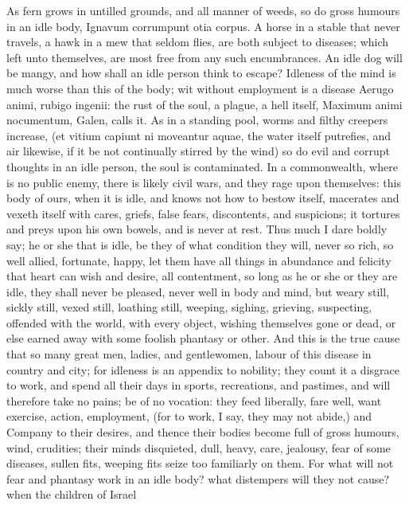 {As fern grows in untilled grounds, and all manner of weeds, so do gross
humours in an idle body, Ignavum corrumpunt otia corpus. A horse in a
stable that never travels, a hawk in a mew that seldom flies, are both
subject to diseases; which left unto themselves, are most free from any
such encumbrances. An idle dog will be mangy, and how shall an idle
person think to escape? Idleness of the mind is much worse than this of
the body; wit without employment is a disease Aerugo animi,
rubigo ingenii: the rust of the soul, a plague, a hell itself,
Maximum animi nocumentum, Galen, calls it. As in a standing pool,
worms and filthy creepers increase, (et vitium capiunt ni moveantur
aquae, the water itself putrefies, and air likewise, if it be not
continually stirred by the wind) so do evil and corrupt thoughts in an
idle person, the soul is contaminated. In a commonwealth, where is no
public enemy, there is likely civil wars, and they rage upon
themselves: this body of ours, when it is idle, and knows not how to
bestow itself, macerates and vexeth itself with cares, griefs, false
fears, discontents, and suspicions; it tortures and preys upon his own
bowels, and is never at rest. Thus much I dare boldly say; he or she
that is idle, be they of what condition they will, never so rich, so
well allied, fortunate, happy, let them have all things in abundance
and felicity that heart can wish and desire, all contentment, so long
as he or she or they are idle, they shall never be pleased, never well
in body and mind, but weary still, sickly still, vexed still, loathing
still, weeping, sighing, grieving, suspecting, offended with the world,
with every object, wishing themselves gone or dead, or else earned away
with some foolish phantasy or other. And this is the true cause that so
many great men, ladies, and gentlewomen, labour of this disease in
country and city; for idleness is an appendix to nobility; they count
it a disgrace to work, and spend all their days in sports, recreations,
and pastimes, and will therefore take no pains; be of no vocation: they
feed liberally, fare well, want exercise, action, employment, (for to
work, I say, they may not abide,) and Company to their desires, and
thence their bodies become full of gross humours, wind, crudities;
their minds disquieted, dull, heavy, \etc{} care, jealousy, fear of some
diseases, sullen fits, weeping fits seize too familiarly on them.
For what will not fear and phantasy work in an idle body? what
distempers will they not cause? when the children of  Israel
}
